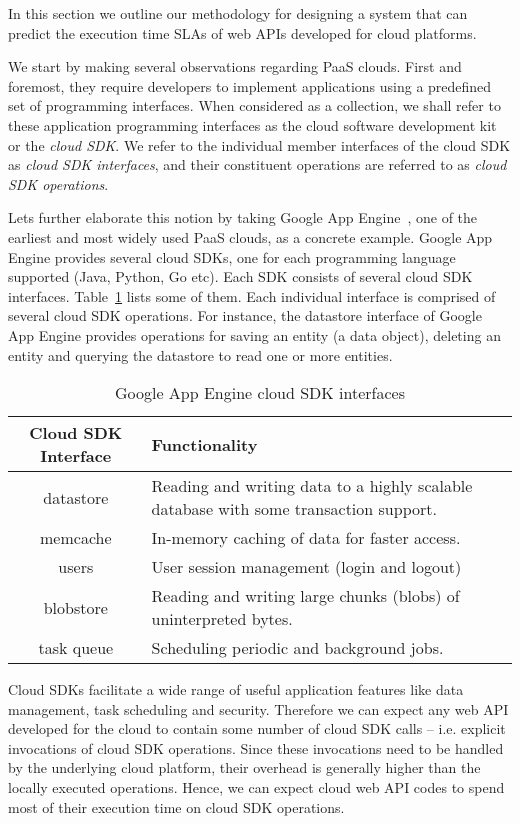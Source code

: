In this section we outline our methodology for designing a system that can predict the execution
time SLAs of web APIs developed for cloud platforms.

We start by making several observations regarding PaaS clouds. First and foremost, 
they require developers
to implement applications using a predefined set of programming interfaces. When considered as a
collection, we shall refer to these application programming interfaces as the cloud software development 
kit or the \textit{cloud SDK}. We refer to the individual member interfaces of the cloud SDK
as \textit{cloud SDK interfaces}, and their constituent operations are referred to as \textit{cloud SDK operations}.

Lets further elaborate this notion by taking Google App Engine~\cite{gae}, one of the earliest and most widely
used PaaS clouds, as a concrete example. Google App Engine provides several cloud SDKs, one for each
programming language supported (Java, Python, Go etc). Each SDK consists of
several cloud SDK interfaces. Table~\ref{tab:gae_cloud_sdk} lists some of them.
Each individual interface is comprised of several cloud SDK operations. For instance, the 
datastore interface of Google App Engine provides operations for saving an entity (a data object),
deleting an entity and querying the datastore to read one or more entities.

\begin{table}[htdp]
\caption{Google App Engine cloud SDK interfaces}
\begin{center}
\begin{tabular}{|c|p{5cm}|}
\hline
Cloud SDK Interface & Functionality \\ \hline
datastore & Reading and writing data to a highly scalable database with some transaction support. \\ \hline
memcache & In-memory caching of data for faster access.\\ \hline
users & User session management (login and logout)\\ \hline
blobstore & Reading and writing large chunks (blobs) of uninterpreted bytes.\\ \hline
task queue & Scheduling periodic and background jobs.\\ \hline
\end{tabular}
\end{center}
\label{tab:gae_cloud_sdk}
\end{table}

Cloud SDKs facilitate a wide range of useful application features like data management, 
task scheduling and security. Therefore we can expect any web API developed for the cloud to
contain some number of cloud SDK calls -- i.e.
explicit invocations of cloud SDK operations. Since these invocations need to be handled by the
underlying cloud platform, their overhead is generally higher than the locally executed operations.
Hence, we can expect cloud web API codes to spend most of their execution time on cloud SDK operations. 

